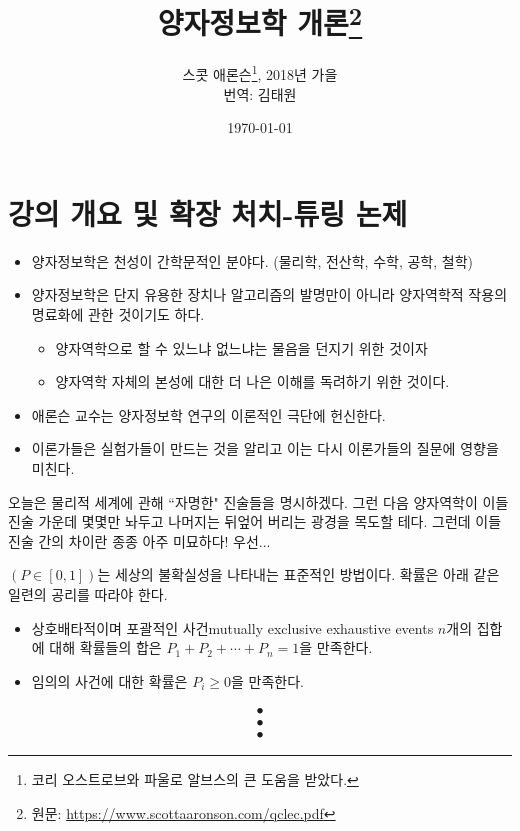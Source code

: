 \documentclass[a4paper,chapter,atbegshi,hidelinks]{oblivoir}
\begin{document}
\title{양자정보학 개론\thanks{원문: \url{https://www.scottaaronson.com/qclec.pdf}}}
\author{
    스콧 애론슨\thanks{코리 오스트로브와 파울로 알브스의 큰 도움을 받았다.}, 
    2018년 가을\\
    번역: 김태원
}
\date{\today}
\newpage
\maketitle\thispagestyle{empty}\newpage

\tableofcontents\pagestyle{mystyle}

\chapter{강의 개요 및 확장 처치-튜링 논제}
\begin{itemize}[label=\(\blacktriangleright\)]
    \item 양자정보학은 천성이 간학문적인 분야다. (물리학, 전산학, 수학, 공학, 철학)
    \item 양자정보학은 단지 유용한 장치나 알고리즘의 발명만이 아니라 양자역학적 작용의 명료화에 관한 것이기도 하다.
    \begin{itemize}
        \item 양자역학으로 할 수 있느냐 없느냐는 물음을 던지기 위한 것이자
        \item 양자역학 자체의 본성에 대한 더 나은 이해를 독려하기 위한 것이다.
    \end{itemize}
    \item 애론슨 교수는 양자정보학 연구의 이론적인 극단에 헌신한다.
    \item 이론가들은 실험가들이 만드는 것을 알리고 이는 다시 이론가들의 질문에 영향을 미친다.
\end{itemize}\hfill\break
오늘은 물리적 세계에 관해 ``자명한" 진술들을 명시하겠다.
그런 다음 양자역학이 이들 진술 가운데 몇몇만 놔두고 나머지는 뒤엎어 버리는 광경을
목도할 테다. 
그런데 이들 진술 간의 차이란 종종 아주 미묘하다!
우선...\hfill\break

\begin{description}[leftmargin=0cm]
    \item[\textbf{확률}\;] 
        $(P\in[0,1])$는 세상의 불확실성을 나타내는 표준적인 방법이다. 
        확률은 아래 같은 일련의 공리를 따라야 한다.
        \begin{itemize}[label=$\blacktriangleright$]
            \item  상호배타적이며 포괄적인 사건{\footnotesize mutually exclusive
            exhaustive events} $n$개의 집합에 대해  
                확률들의 합은 $P_1+P_2+\cdots+P_n=1$을 만족한다.
            \item 임의의 사건에 대한 확률은 $P_i\geq0$을 만족한다.
        \end{itemize}
        \begin{align*}\bullet\\\bullet\\\bullet\end{align*}
\end{description}
\end{document}
